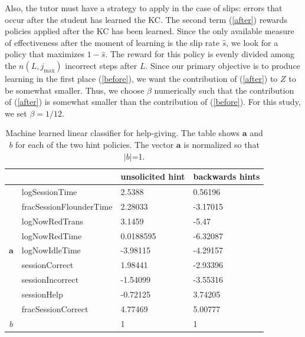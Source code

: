 \documentclass{edm_template}
\begin{document}
Also, the tutor must have a strategy to apply in the case of slips: 
errors that occur after the student has learned the KC.
The second term (\ref{after}) rewards policies applied after
the KC has been learned.  Since the only available measure of 
effectiveness after the moment of learning is the slip rate $\hat{s}$, 
we look for a policy that maximizes $1-\hat{s}$.  The reward for 
this policy is evenly divided among the $n(L,j_\mathrm{max})$ 
incorrect steps after $L$.
Since our primary objective is to produce learning in the first
place (\ref{before}), we want the contribution of (\ref{after})
to $Z$ to be somewhat smaller.  Thus, we choose $\beta$ numerically 
such that the contribution of (\ref{after}) is somewhat smaller than 
the contribution of (\ref{before}).  For this study, we set $\beta=1/12$.

\begin{table}
\caption{Machine learned linear classifier for help-giving.  The
  table shows $\mathbf{a}$ and $b$ for each of the two hint policies.
The vector $\mathbf{a}$  is normalized so that $|b|$=1.}
\label{results}
\begin{tabular}{cl|p{11ex}p{11ex}}
 &  & unsolicited hint & backwards hints \\
\hline
\multirow{9}{*}{$\mathbf{a}$} & logSessionTime  & 2.5388 & 0.56196\\ 
 & fracSessionFlounderTime & 2.28033 & -3.17015\\ 
 & logNowRedTrans  & 3.1459 & -5.47\\ 
 & logNowRedTime & 0.0188595 & -6.32087\\ 
 & logNowIdleTime & -3.98115 & -4.29157\\ 
 & sessionCorrect & 1.98441 & -2.93396\\ 
 & sessionIncorrect & -1.54099 & -3.55316\\
 & sessionHelp & -0.72125 & 3.74205\\ 
 & fracSessionCorrect & 4.77469 & 5.00777\\
\hline\hline 
$b$ & & 1 & 1
\end{tabular}
\end{table}
\end{document}
